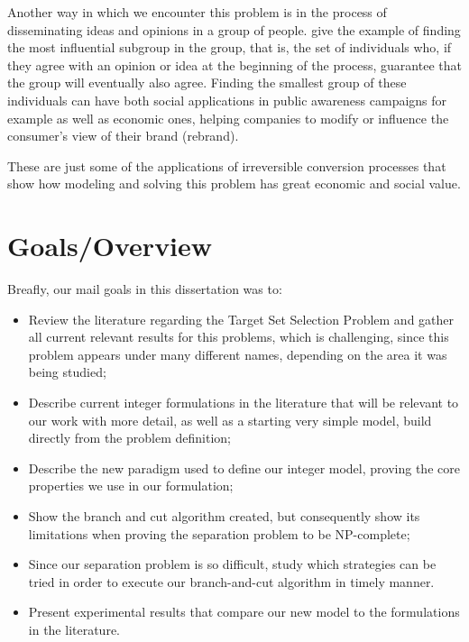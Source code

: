 Another way in which we encounter this problem is in the process of disseminating ideas and opinions in a group of people. \citeauthor{dreyer2009} give the example of finding the most influential subgroup in the group, that is, the set of individuals who, if they agree with an opinion or idea at the beginning of the process, guarantee that the group will eventually also agree. Finding the smallest group of these individuals can have both social applications in public awareness campaigns for example as well as economic ones, helping companies to modify or influence the consumer's view of their brand (rebrand).

These are just some of the applications of irreversible conversion processes that show how modeling and solving this problem has great economic and social value.


\section{Goals/Overview}


Breafly, our mail goals in this dissertation was to:
\begin{itemize}
\item Review the literature regarding the Target Set Selection Problem and gather all current relevant results for this problems, which is challenging, since this problem appears under many different names, depending on the area it was being studied;
\item Describe current integer formulations in the literature that will be relevant to our work with more detail, as well as a starting very simple model, build directly from the problem definition;
\item Describe the new paradigm used to define our integer model, proving the core properties we use in our formulation; 
\item Show the branch and cut algorithm created, but consequently show its limitations when proving the separation problem to be NP-complete; 
\item Since our separation problem is so difficult, study which strategies can be tried in order to execute our branch-and-cut algorithm in timely manner. 
\item Present experimental results that compare our new model to the formulations in the literature.
\end{itemize}
